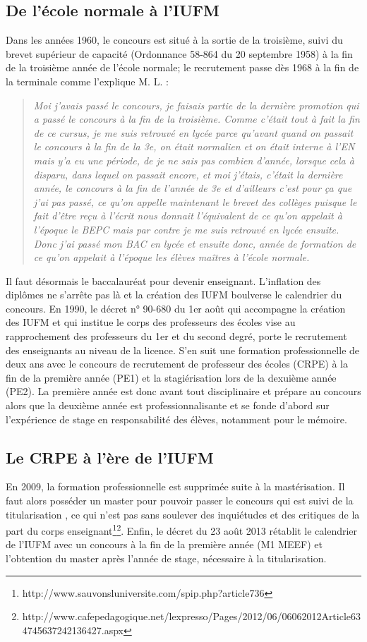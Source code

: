 \documentclass[a4paper,11pt]{article}
\begin{document}
			\subsection{De l'école normale à l'IUFM}
					Dans les années 1960, le concours est situé à la sortie de la troisième, suivi du brevet supérieur de capacité (Ordonnance 58-864 du 20 septembre 1958) à la fin de la troisième année de l'école normale; le recrutement passe dès 1968 à la fin de la terminale comme l'explique M. L. :
			\begin{quote}
			\emph{Moi j'avais passé le concours, je faisais partie de la dernière promotion qui a passé le concours à la fin de la troisième. Comme c'était tout à fait la fin de ce cursus, je me suis retrouvé en lycée parce qu'avant quand on passait le concours à la fin de la 3e, on était normalien et on était interne à l'EN mais y'a eu une période, de je ne sais pas combien d'année, lorsque cela à disparu, dans lequel on passait encore, et moi j'étais, c'était la dernière année, le concours à la fin de l'année de 3e et d'ailleurs c'est pour ça que j'ai pas passé, ce qu'on appelle maintenant le brevet des collèges puisque le fait d'être reçu à l'écrit nous donnait l'équivalent de ce qu'on appelait à l'époque le BEPC mais par contre je me suis retrouvé en lycée ensuite. Donc j'ai passé mon BAC en lycée et ensuite donc, année de formation de ce qu'on appelait à l'époque les élèves maîtres à l'école normale.}
			\end{quote}
			Il faut désormais le baccalauréat pour devenir enseignant. L'inflation des diplômes ne s'arrête pas là et la création des IUFM boulverse le calendrier du concours. En 1990, le décret n° 90-680 du 1er août qui accompagne la création des IUFM et qui institue le corps des professeurs des écoles vise au rapprochement des professeurs du 1er et du second degré, porte le recrutement des enseignants au niveau de la licence. S'en suit une formation professionnelle de deux ans avec le concours de recrutement de professeur des écoles (CRPE) à la fin de la première année (PE1) et la stagiérisation lors de la dexuième année (PE2). La première année est donc avant tout disciplinaire et prépare au concours alors que la deuxième année est professionnalisante et se fonde d'abord sur l'expérience de stage en responsabilité des élèves, notamment pour le mémoire.
			\subsection{Le CRPE à l'ère de l'IUFM}
			En 2009, la formation professionnelle est supprimée suite à la mastérisation. Il faut alors posséder un master pour pouvoir passer le concours qui est suivi de la titularisation , ce qui n'est pas sans soulever des inquiétudes et des critiques de la part du corps enseignant\footnote{http://www.sauvonsluniversite.com/spip.php?article736}\footnote{http://www.cafepedagogique.net/lexpresso/Pages/2012/06/06062012Article634745637242136427.aspx}. Enfin, le décret du 23 août 2013 rétablit le calendrier de l'IUFM avec un concours à la fin de la première année (M1 MEEF) et l'obtention du master après l'année de stage, nécessaire à la titularisation.
			
\end{document}
